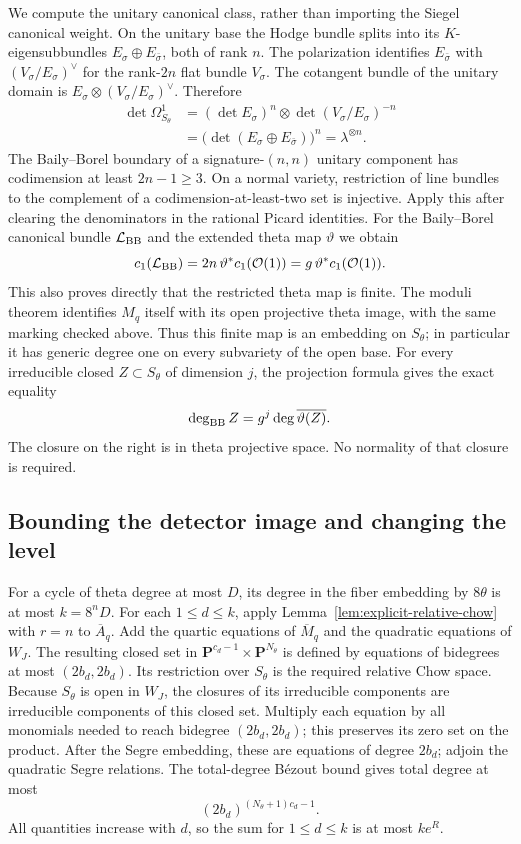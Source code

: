 \documentclass[11pt]{article}
\theoremstyle{definition}
\theoremstyle{remark}
\begin{document}
We compute the unitary canonical class, rather than importing
the Siegel canonical weight.  On the unitary base the Hodge
bundle splits into its $K$-eigensubbundles
$E_\sigma\oplus E_{\bar\sigma}$, both of rank $n$.
The polarization identifies $E_{\bar\sigma}$ with
$(V_\sigma/E_\sigma)^\vee$ for the rank-$2n$ flat bundle
$V_\sigma$.  The cotangent bundle of the unitary domain is
$E_\sigma\otimes(V_\sigma/E_\sigma)^\vee$.  Therefore
\begin{align*}
 \det\Omega^1_{S_\theta}
 &= (\det E_\sigma)^n\otimes\det(V_\sigma/E_\sigma)^{-n}\\
 &=\bigl(\det(E_\sigma\oplus E_{\bar\sigma})\bigr)^n
 =\lambda^{\otimes n}.
\end{align*}
The Baily--Borel boundary of a signature-$(n,n)$ unitary
component has codimension at least $2n-1\geq3$.  On a normal
variety, restriction of line bundles to the complement of a
codimension-at-least-two set is injective.  Apply this after
clearing the denominators in the rational Picard identities.
For the Baily--Borel canonical bundle $\mathcal L_{\rm BB}$
and the extended theta map $\vartheta$ we obtain
\[
 c_1(\mathcal L_{\rm BB})
   =2n\,\vartheta^*c_1(\mathcal O(1))
   =g\,\vartheta^*c_1(\mathcal O(1)).
\]
This also proves directly that the restricted theta map is
finite.  The moduli theorem identifies $M_q$ itself with its
open projective theta image, with the same marking checked
above.  Thus this finite map is an embedding on $S_\theta$;
in particular it has generic degree one on every subvariety
of the open base.  For every
irreducible closed $Z\subset S_\theta$ of dimension $j$,
the projection formula gives the exact equality
\begin{equation}\label{eq:unitary-theta-degree}
 \deg_{\rm BB}Z=g^j\deg\overline{\vartheta(Z)}.
\end{equation}
The closure on the right is in theta projective space.  No
normality of that closure is required.

\subsection{Bounding the detector image and changing the level}

For a cycle of theta degree at most $D$, its degree in the
fiber embedding by $8\theta$ is at most $k=8^nD$.
For each $1\leq d\leq k$, apply
Lemma~\ref{lem:explicit-relative-chow} with $r=n$ to
$\overline A_q$.  Add the quartic equations of
$\overline M_q$ and the quadratic equations of $W_J$.
The resulting closed set in
$\mathbf P^{c_d-1}\times\mathbf P^{N_\theta}$ is defined by equations
of bidegrees at most $(2b_d,2b_d)$.  Its restriction over
$S_\theta$ is the required relative Chow space.  Because
$S_\theta$ is open in $W_J$, the closures of its irreducible
components are irreducible components of this closed set.
Multiply each equation by all monomials needed to reach
bidegree $(2b_d,2b_d)$; this preserves its zero set on the
product.  After the Segre embedding, these are equations of
degree $2b_d$; adjoin the quadratic Segre relations.
The total-degree B\'ezout bound gives total degree at most
\[
 (2b_d)^{(N_\theta+1)c_d-1}.
\]
All quantities increase with $d$, so the sum for
$1\leq d\leq k$ is at most $k e^R$.
\end{document}
